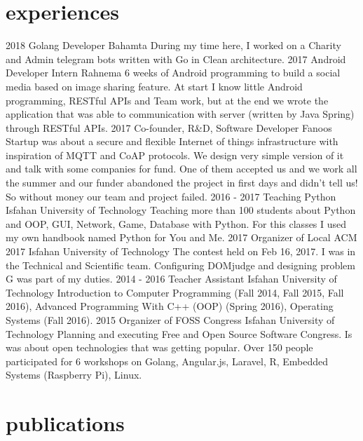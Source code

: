 \documentclass[]{friggeri-cv}
\begin{document}
\section{experiences}

\begin{entrylist}
	\entry
	{2018}
	{Golang Developer}
	{Bahamta}
	{During my time here, I worked on a Charity and Admin telegram bots written with Go in Clean architecture.}
	\entry
	{2017}
	{Android Developer Intern}
	{Rahnema}
	{6 weeks of Android programming to build a social media based on image sharing feature. At start I know little Android programming, RESTful APIs and Team work, but at the end we wrote the application that was able to communication with server (written by Java Spring) through RESTful APIs.}
	\entry
	{2017}
	{Co-founder, R\&D, Software Developer}
	{Fanoos}
	{Startup was about a secure and flexible Internet of things infrastructure with inspiration of MQTT and CoAP protocols. We design very simple version of it and talk with some companies for fund. One of them accepted us and we work all the summer and our funder abandoned the project in first days and didn't tell us! So without money our team and project failed.}
	\entry
	{2016 - 2017}
	{Teaching Python}
	{Isfahan University of Technology}
	{Teaching more than 100 students about Python and OOP, GUI, Network, Game, Database with Python. For this classes I used my own handbook named Python for You and Me.}
	\entry
	{2017}
	{Organizer of Local ACM 2017}
	{Isfahan University of Technology}
	{The contest held on Feb 16, 2017. I was in the Technical and Scientific team. Configuring DOMjudge and designing problem G was part of my duties.}
	\entry
	{2014 - 2016}
	{Teacher Assistant}
	{Isfahan University of Technology}
	{Introduction to Computer Programming (Fall 2014, Fall 2015, Fall 2016),
		Advanced Programming With C++ (OOP) (Spring 2016),
		Operating Systems (Fall 2016).}
	\entry
	{2015}
	{Organizer of FOSS Congress}
	{Isfahan University of Technology}
	{Planning and executing Free and Open Source Software Congress. Is was about open technologies that was getting popular. Over 150 people participated for 6 workshops on Golang, Angular.js, Laravel, R, Embedded Systems (Raspberry Pi), Linux.}
\end{entrylist}

\pagebreak

\section{publications}
\end{document}
